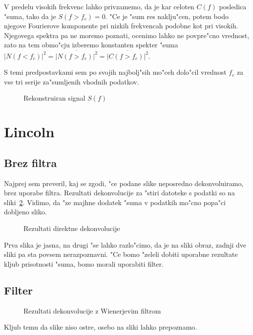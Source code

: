 \documentclass[a4paper,10pt]{article}
\begin{document}
V predelu visokih frekvenc lahko privzamemo, da je kar celoten $C(f)$ posledica "suma, tako da je $S(f>f_c) = 0$. "Ce je "sum res naklju"cen, potem bodo njegove Fourierove komponente pri nizkih frekvencah podobne kot pri visokih. Njegovega spektra pa ne moremo poznati, ocenimo lahko ne povpre"cno vrednost, zato na tem obmo"cju izberemo konstanten spekter "suma $|N(f < f_c)|^2 = \overline{|N(f>f_c)|^2} = \overline{|C(f>f_c)|^2}$. 

S temi predpostavkami sem po svojih najbolj"sih mo"ceh dolo"cil vrednost $f_c$ za vse tri serije za"sumljenih vhodnih podatkov. 

\begin{figure}[h]

\caption{Rekonstruiran signal $S(f)$}
\label{fig:signal-rekonstruiran}
\end{figure}

\section{Lincoln}

\subsection{Brez filtra}
Najprej sem preveril, kaj se zgodi, "ce podane slike neposredno dekonvoluiramo, brez uporabe filtra. Rezultati dekonvolucije za "stiri datoteke s podatki so na sliki~\ref{fig:lincoln-direkt}. Vidimo, da "ze majhne dodatek "suma v podatkih mo"cno popa"ci dobljeno sliko. 

\begin{figure}[h]
 \centering
{}
\caption{Rezultati direktne dekonvolucije}
\label{fig:lincoln-direkt}
\end{figure}

Prva slika je jasna, na drugi "se lahko razlo"cimo, da je na sliki obraz, zadnji dve sliki pa sta povsem nerazpoznavni. "Ce bomo "zeleli dobiti uporabne rezultate kljub prisotnosti "suma, bomo morali uporabiti filter. 

\subsection{Filter}

\begin{figure}[h]
 \centering
{}
\caption{Rezultati dekonvolucije z Wienerjevim filtrom}
\label{fig:lincoln-filter}
\end{figure}

Kljub temu da slike niso ostre, osebo na sliki lahko prepoznamo. 
\end{document}
